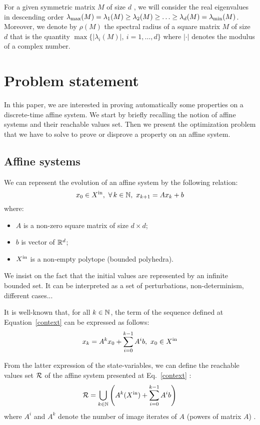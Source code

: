 \documentclass[10pt]{article}
\begin{document}
For a given symmetric matrix $M$ of size $d$ , we will consider the real eigenvalues in descending order   $\lambda_{\operatorname{max}}(M)=\lambda_1(M)\geq \lambda_2(M)\geq \ldots\geq \lambda_d(M)=\lambda_{\operatorname{min}}(M)$. Moreover, we denote by $\rho(M)$ the spectral radius of a square matrix $M$ of size $d$ that is the quantity $\max\{|\lambda_i(M)|,\ i=1,\ldots,d\}$ where $|\cdot|$ denotes the modulus of a complex number.

\section{Problem statement}
In this paper, we are interested in proving automatically some properties on a discrete-time affine system. We start by briefly recalling the notion of affine systems and their reachable values set. Then we present the optimization problem that we have to solve to prove or disprove a property on an affine system.

\subsection{Affine systems}

We can represent the evolution of an affine system by the following relation:
\begin{equation}
\label{context}
x_0\in X^\mathrm{in},\ \forall\, k\in\mathbb{N},\ x_{k+1}=A x_k + b  
\end{equation}
where:
\begin{itemize}
\item $A$ is a non-zero square matrix of size $d\times d$;
\item $b$ is vector of $\mathbb R^d$;
\item  $X^\mathrm{in}$ is a non-empty polytope (bounded polyhedra). 
\end{itemize}
We insist on the fact that the initial values are represented by an infinite bounded set. It can be interpreted as a set of perturbations, non-determinism, different cases...

It is well-known that, for all $k\in\mathbb{N}$, the term of the sequence defined at Equation~\eqref{context} can be expressed as follows:
\[
x_k=A^k x_0+ \sum_{i=0}^{k-1} A^i b,\ x_0\in\xin
\]

From the latter expression of the state-variables, we can define the reachable values set $\mathcal{R}$ of the affine system presented at Eq.~\eqref{context} :
\begin{equation}
\label{reach}
\mathcal{R}=\bigcup_{k\in \mathbb{N}} \left(A^{k}(X^\mathrm{in})+\sum_{i=0}^{k-1} A^i b\right)
\end{equation}
where $A^i$ and $A^k$ denote the number of image iterates of $A$ (powers of matrix $A$) . 
\end{document}
